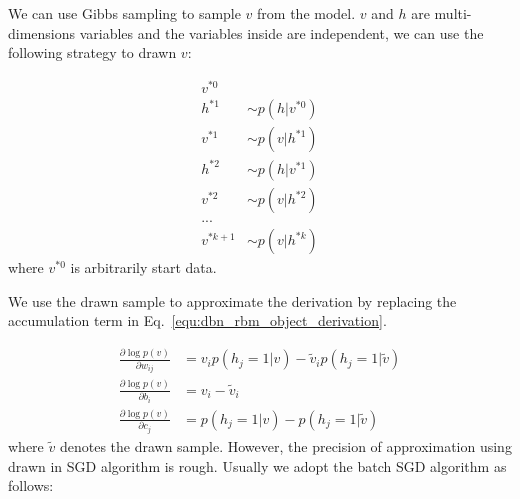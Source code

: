 \documentclass[runningheads,openany]{xhlPaper}
\begin{document}
We can use Gibbs sampling to sample $v$ from the model. $v$ and $h$ are multi-dimensions variables and the variables inside are independent, we can use the following strategy to drawn $v$:

\begin{displaymath}
\label{equ:dbn_rbm_gibbs_sampling}
\begin{aligned}
{v^{*0}}&\\
{h^{*1}} &\sim p\left( {h|{v^{*0}}} \right)\\
{v^{*1}} &\sim p\left( {v|{h^{*1}}} \right)\\
{h^{*2}} &\sim p\left( {h|{v^{*1}}} \right)\\
{v^{*2}} &\sim p\left( {v|{h^{*2}}} \right)\\
...\\
{v^{*k + 1}} &\sim p\left( {v|{h^{*k}}} \right)
\end{aligned}
\end{displaymath}
where ${v^{*0}}$ is arbitrarily start data.

We use the drawn sample to approximate the derivation by replacing the accumulation term in Eq.~\ref{equ:dbn_rbm_object_derivation}.

\begin{equation}
\label{equ:dbn_rbm_drawn_approximation}
\begin{aligned}
\frac{{\partial \log p\left( v \right)}}{{\partial {w_{ij}}}} &= {v_i}p\left( {{h_j} = 1|v} \right) - {{\tilde v}_i}p\left( {{h_j} = 1|\tilde v} \right)\\
\frac{{\partial \log p\left( v \right)}}{{\partial {b_i}}} &= {v_i} - {{\tilde v}_i}\\
\frac{{\partial \log p\left( v \right)}}{{\partial {c_j}}} &= p\left( {{h_j} = 1|v} \right) - p\left( {{h_j} = 1|\tilde v} \right)
\end{aligned}
\end{equation}
where $\tilde{v}$ denotes the drawn sample.
However, the precision of approximation using drawn in SGD algorithm is rough.
Usually we adopt the batch SGD algorithm as follows:
\end{document}
